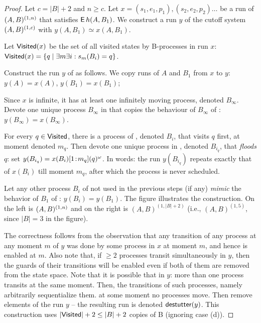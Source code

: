 \begin{proof}
Let $c = |B|+2$ and $n \geq c$. Let $x=(s_1,e_1,p_1), (s_2,e_2,p_2) \ldots$ be a run of $(A,B)^{(1,n)}$ that satisfies $\operatorname{\mathsf{E}} h(A,B_1)$. We construct a run $y$ of the cutoff system $(A,B)^{(1,c)}$ with $y(A, B_1) \simeq x(A, B_1)$.

Let $\mathsf{Visited}(x)$ be the set of all visited states by B-processes in run $x$: $\mathsf{Visited}(x) = \{ q \mid \exists m \exists i: s_m(B_i) = q \}$. 

Construct the run $y$ of \cutoffsys as follows.
\li
  \-[a.] We copy runs of $A$ and $B_1$ from $x$ to $y$:
         $y(A)=x(A)$, $y(B_1)=x(B_1)$;

  \-[b.] Since $x$ is infinite, it has at least one infinitely moving process, denoted $B_\infty$. Devote one unique process $B_\infty$ in \cutoffsys that copies the behaviour of $B_\infty$ of \largesys: $y(B_\infty)=x(B_\infty)$.

  \-[c.] For every $q \in \mathsf{Visited}$, there is a process of \largesys, denoted $B_i$, that visits $q$ first, at moment denoted $m_q$. Then devote one unique process in \cutoffsys, denoted $B_{i_q}$, that \emph{floods $q$}: set $y(B_{i_q}) = x(B_i)[{1}\!:\!{m_q}](q)^\omega$. In words: the run $y(B_{i_q})$ repeats exactly that of $x(B_i)$ till moment $m_q$, after which the process is never scheduled.

  \-[d.] Let any other process $B_i$ of \cutoffsys not used in the previous steps (if any) \emph{mimic} the behavior of $B_1$ of \cutoffsys: $y(B_i) = y(B_1)$.
\il
The figure illustrates the construction.
On the left is $(A,B)^{(1,n)}$ and on the right is $(A,B)^{(1,|B|+2)}$
(i.e., $(A,B)^{(1,5)}$, since $|B|=3$ in the figure).

\begin{figure}[hp]
\centering
\scalebox{0.7}{

}
\end{figure}

The correctness follows from the observation that any transition of any process at any moment $m$ of $y$ was done by some process in $x$ at moment $m$, and hence is enabled at $m$. Also note that, if $\geq 2$ processes transit simultaneously in $y$, then the guards of their transitions will be enabled even if both of them are removed from the state space. Note that it is possible that in $y$:
\li
  \- more than one process transits at the same moment. Then, \emph{\interleave} the transitions of such processes, namely arbitrarily sequentialize them. 
  \- at some moment no processes move. Then remove elements of the run $y$ -- the resulting run is denoted $\mathsf{destutter}(y)$.
\il
This construction uses $|\mathsf{Visited}| + 2 \leq |B|+2$ copies of B (ignoring case (d)).
\end{proof} 

